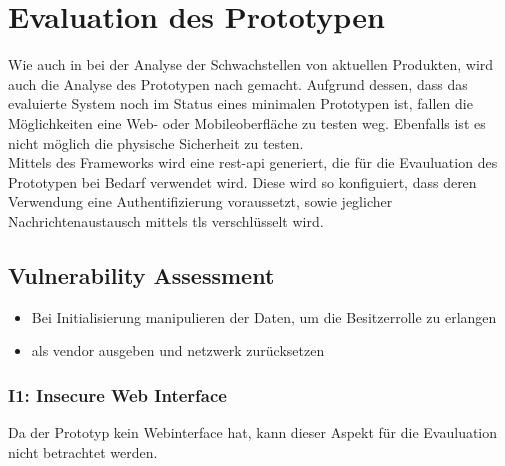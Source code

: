 \section{Evaluation des Prototypen}
\label{sec:evaluation}
    Wie auch in  bei der Analyse der Schwachstellen von aktuellen Produkten, wird auch die Analyse des Prototypen nach \cite{Miessler} gemacht. 
    Aufgrund dessen, dass das evaluierte System noch im Status eines minimalen Prototypen ist, fallen die Möglichkeiten eine Web- oder Mobileoberfläche zu testen weg. 
    Ebenfalls ist es nicht möglich die physische Sicherheit zu testen.
    \medskip\\
    Mittels des Frameworks wird eine \gls{rest}-\gls{api} generiert, die für die Evauluation des Prototypen bei Bedarf verwendet wird. 
    Diese wird so konfiguiert, dass deren Verwendung eine Authentifizierung voraussetzt, sowie jeglicher Nachrichtenaustausch mittels \gls{tls} verschlüsselt wird.

    \subsection{Vulnerability Assessment}
        \begin{itemize}[noitemsep]
            \item Bei Initialisierung manipulieren der Daten, um die Besitzerrolle zu erlangen
            \item als vendor ausgeben und netzwerk zurücksetzen
        \end{itemize}
    
        \subsubsection*{I1: Insecure Web Interface}
            Da der Prototyp kein Webinterface hat, kann dieser Aspekt für die Evauluation nicht betrachtet werden.
           
